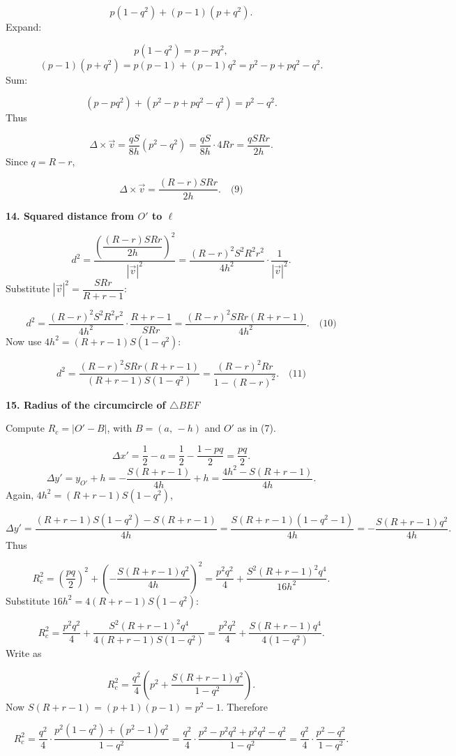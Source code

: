 \documentclass{llmxive}
\providecommand{\solutionheading}[1]{\par\smallskip\noindent\textbf{#1}\par}
\begin{document}
\[
p (1 - q^2) + (p - 1)(p + q^2).
\]
Expand:\par
\[
p(1 - q^2) = p - p q^2,
\]
\[
(p - 1)(p + q^2) = p(p-1) + (p-1)q^2 = p^2 - p + p q^2 - q^2.
\]
Sum:\par
\[
(p - p q^2) + (p^2 - p + p q^2 - q^2) = p^2 - q^2.
\]
Thus\par
\[
\Delta \times \vec{v} = \frac{q S}{8h} (p^2 - q^2) = \frac{q S}{8h} \cdot 4Rr = \frac{q S R r}{2 h}.
\]
Since \(q = R - r\),\par
\[
\Delta \times \vec{v} = \frac{ (R - r) S R r}{2 h}. \quad\text{(9)}
\]
\solutionheading{14. Squared distance from \(O'\) to \(\ell\)}
\[
d^2 = \frac{ \left( \dfrac{ (R - r) S R r}{2 h} \right)^2 }{ |\vec{v}|^2 }
= \frac{ (R - r)^2 S^2 R^2 r^2}{4 h^2} \cdot \frac{1}{|\vec{v}|^2}.
\]
Substitute \(|\vec{v}|^2 = \dfrac{S R r}{R+r-1}\):\par
\[
d^2 = \frac{ (R - r)^2 S^2 R^2 r^2}{4 h^2} \cdot \frac{R+r-1}{S R r}
= \frac{ (R - r)^2 S R r (R+r-1)}{4 h^2}. \quad\text{(10)}
\]
Now use \(4h^2 = (R+r-1) S (1 - q^2)\):\par
\[
d^2 = \frac{ (R - r)^2 S R r (R+r-1)}{ (R+r-1) S (1 - q^2) }
= \frac{ (R - r)^2 R r}{1 - (R - r)^2}. \quad\text{(11)}
\]
\solutionheading{15. Radius of the circumcircle of \(\triangle BEF\)}
Compute \(R_c = |O' - B|\), with \(B = (a,\,-h)\) and \(O'\) as in (7).\par
\[
\Delta x' = \frac12 - a = \frac12 - \frac{1 - p q}{2} = \frac{p q}{2}.
\]
\[
\Delta y' = y_{O'} + h = -\frac{S (R+r-1)}{4h} + h = \frac{4h^2 - S (R+r-1)}{4h}.
\]
Again, \(4h^2 = (R+r-1) S (1 - q^2)\),\par
\[
\Delta y' = \frac{ (R+r-1) S (1 - q^2) - S (R+r-1) }{4h} = \frac{ S (R+r-1) (1 - q^2 - 1)}{4h} = -\frac{ S (R+r-1) q^2}{4h}.
\]
Thus\par
\[
R_c^2 = \left(\frac{p q}{2}\right)^2 + \left(-\frac{ S (R+r-1) q^2}{4h}\right)^2
= \frac{p^2 q^2}{4} + \frac{ S^2 (R+r-1)^2 q^4}{16 h^2}.
\]
Substitute \(16 h^2 = 4 (R+r-1) S (1 - q^2)\):\par
\[
R_c^2 = \frac{p^2 q^2}{4} + \frac{ S^2 (R+r-1)^2 q^4}{4 (R+r-1) S (1 - q^2)}
= \frac{p^2 q^2}{4} + \frac{ S (R+r-1) q^4}{4 (1 - q^2)}.
\]
Write as\par
\[
R_c^2 = \frac{q^2}{4}\left( p^2 + \frac{ S (R+r-1) q^2}{1 - q^2} \right).
\]
Now \(S (R+r-1) = (p+1)(p-1) = p^2 - 1.\) Therefore\par
\[
R_c^2 = \frac{q^2}{4} \cdot \frac{ p^2(1 - q^2) + (p^2 - 1) q^2}{1 - q^2}
= \frac{q^2}{4} \cdot \frac{ p^2 - p^2 q^2 + p^2 q^2 - q^2}{1 - q^2}
= \frac{q^2}{4} \cdot \frac{ p^2 - q^2}{1 - q^2}.
\]
\end{document}
